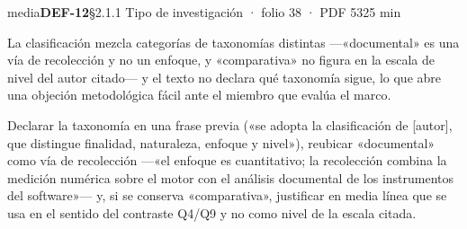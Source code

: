 {\small{}\par}
\begin{ficha}{media}{\casilla\textbf{DEF-12}\quad{}\quad §2.1.1 Tipo de investigación · folio 38 · PDF 53\hfill 25 min}
\par
{}La clasificación mezcla categorías de taxonomías distintas —«documental» es una vía de recolección y no un enfoque, y «comparativa» no figura en la escala de nivel del autor citado— y el texto no declara qué taxonomía sigue, lo que abre una objeción metodológica fácil ante el miembro que evalúa el marco.\par
{}Declarar la taxonomía en una frase previa («se adopta la clasificación de [autor]\allowbreak{}, que distingue finalidad, naturaleza, enfoque y nivel»), reubicar «documental» como vía de recolección —«el enfoque es cuantitativo; la recolección combina la medición numérica sobre el motor con el análisis documental de los instrumentos del software»— y, si se conserva «comparativa», justificar en media línea que se usa en el sentido del contraste Q4/\allowbreak{}Q9 y no como nivel de la escala citada.\par
\end{ficha}
